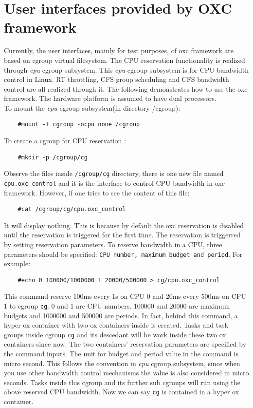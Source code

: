 \section{User interfaces provided by OXC framework}
Currently, the user interfaces, mainly for test purposes, 
of oxc framework are based on cgroup virtual
filesystem. The CPU reservation functionality is realized through 
\emph{cpu} cgroup subsystem. This \emph{cpu} cgroup subsystem is for CPU 
bandwidth control in Linux. RT throttling, CFS group scheduling and 
CFS bandwidth control are all realized through it. The following demonstrates 
how to use the oxc framework. The hardware platform is assumed to have dual
processors.\\
To mount the \emph{cpu} cgroup subsystem(in directory /cgroup):
\begin{lstlisting}
	#mount -t cgroup -ocpu none /cgroup
\end{lstlisting} 
To create a cgroup for CPU reservation :
\begin{lstlisting}
	#mkdir -p /cgroup/cg
\end{lstlisting}
Observe the files inside \texttt{/cgroup/cg} directory, there is one
new file named \texttt{cpu.oxc\_control} and it is the interface to control
CPU bandwidth in oxc framework. However, if one tries to see the content
of this file:
\begin{lstlisting}
	#cat /cgroup/cg/cpu.oxc_control
\end{lstlisting}
It will display nothing. This is because by default the oxc reservation
is disabled until the reservation is triggered for the first 
time. The reservation is triggerred by setting reservation parameters.
To reserve bandwidth in a CPU, three parameters should be specified:
\texttt{CPU number, maximum budget and period}. For example:
\begin{lstlisting}
	#echo 0 100000/1000000 1 20000/500000 > cg/cpu.oxc_control
\end{lstlisting}
This command reserve 100ms every 1s on CPU 0 and 20ms every 500ms on CPU 1
to cgroup \texttt{cg}. 0 and 1 are CPU numbers. 100000 and 20000 are maximum
budgets and 1000000 and 500000 are periods. 
In fact, behind this command, a hyper ox container with two ox containers
inside is created. 
Tasks and task groups inside cgroup \texttt{cg} and its
descedant will be work inside these two ox containers since now.
The two containers' reservation parameters are specified
by the command inputs. 
The unit for budget and period value in the command 
is micro second. This follows the convention in \emph{cpu} cgroup
subsystem, since when you use other bandwidth control mechanisms the value 
is also considered in micro seconds. Tasks inside this cgroup and its further 
sub cgroups will run using the above reserved CPU bandwidth. Now we can say 
\texttt{cg} is contained in a hyper ox container.

